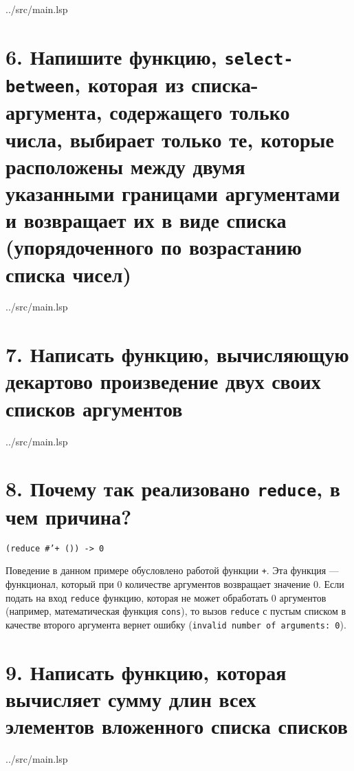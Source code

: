 \begin{lstinputlisting}[
	caption={Задание 5},
	label={lst:t5},
	style={lsp},
	linerange={14-15},
	]{../src/main.lsp}
\end{lstinputlisting}

\section*{6. Напишите функцию, \texttt{select-between}, которая из списка-аргумента, содержащего только числа, выбирает только те, которые расположены между двумя указанными границами аргументами и возвращает их в виде списка (упорядоченного по возрастанию списка чисел)}

\begin{lstinputlisting}[
	caption={Задание 6},
	label={lst:t6},
	style={lsp},
	linerange={17-21},
	]{../src/main.lsp}
\end{lstinputlisting}

\section*{7. Написать функцию, вычисляющую декартово произведение двух своих списков	аргументов}

\begin{lstinputlisting}[
	caption={Задание 7},
	label={lst:t7},
	style={lsp},
	linerange={23-28},
	]{../src/main.lsp}
\end{lstinputlisting}

\section*{8. Почему так реализовано \texttt{reduce}, в чем причина?}

\texttt{(reduce \#'+ ()) -> 0}

Поведение в данном примере обусловлено работой функции \texttt{+}. Эта функция --- функционал, который при 0 количестве аргументов возвращает значение 0. Если подать на вход \texttt{reduce} функцию, которая не может обработать 0 аргументов (например, математическая функция \texttt{cons}), то вызов \texttt{reduce} с пустым списком в качестве второго аргумента вернет ошибку (\texttt{invalid number of arguments: 0}).

\section*{9. Написать функцию, которая вычисляет сумму длин всех элементов вложенного списка списков}

\begin{lstinputlisting}[
	caption={Задание 9},
	label={lst:t9},
	style={lsp},
	linerange={30-33},
	]{../src/main.lsp}
\end{lstinputlisting}
